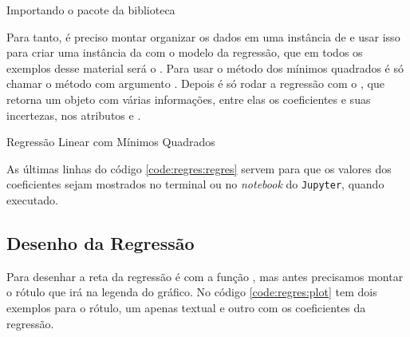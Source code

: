     \begin{listing}[H]
        \caption{Importando o pacote  da biblioteca \scipy}
        \label{code:regres:odr}

    \end{listing}

    Para tanto, é preciso montar organizar os dados em uma instância de  e usar isso para criar uma instância da  com o modelo da regressão, que em todos os exemplos desse material será o . Para usar o método dos mínimos quadrados é só chamar o método  com argumento . Depois é só rodar a regressão com o , que retorna um objeto  com várias informações, entre elas os coeficientes e suas incertezas, nos atributos  e .

    \begin{listing}[H]
        \caption{Regressão Linear com Mínimos Quadrados}
        \label{code:regres:regres}

    \end{listing}

    As últimas linhas do código \ref{code:regres:regres} servem para que os valores dos coeficientes sejam mostrados no terminal ou no \textit{notebook} do \texttt{Jupyter}, quando executado.


\subsection{Desenho da Regressão}

    Para desenhar a reta da regressão é com a função , mas antes precisamos montar o rótulo que irá na legenda do gráfico. No código \ref{code:regres:plot} tem dois exemplos para o rótulo, um apenas textual e outro com os coeficientes da regressão.

